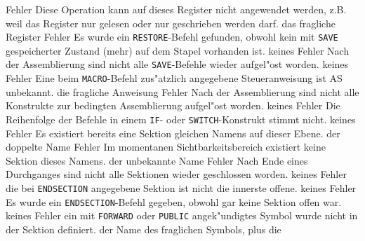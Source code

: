 \documentclass[12pt,a4paper,twoside]{report}
\newcommand{\tty}[1]{{\tt #1}}
\begin{document}
\begin{description}
               {Fehler}
               {Diese Operation kann auf dieses Register nicht angewendet werden, z.B.
                weil das Register nur gelesen oder nur geschrieben werden darf.}
               {das fragliche Register}
               {Fehler}
               {Es wurde ein \tty{RESTORE}-Befehl gefunden, obwohl
                kein mit \tty{SAVE} gespeicherter Zustand (mehr) auf dem Stapel
                vorhanden ist.}
               {keines}
               {Fehler}
               {Nach der Assemblierung sind nicht alle
                \tty{SAVE}-Befehle wieder aufgel"ost worden.}
               {keines}
               {Fehler}
               {Eine beim \tty{MACRO}-Befehl zus"atzlich angegebene
                Steueranweisung ist AS unbekannt.}
               {die fragliche Anweisung}
               {Fehler}
               {Nach der Assemblierung sind nicht alle
                Konstrukte zur bedingten Assemblierung aufgel"ost
                worden.}
               {keines}
               {Fehler}
               {Die Reihenfolge der Befehle in einem \tty{IF}-
	        oder \tty{SWITCH}-Konstrukt stimmt nicht.}
               {keines}
               {Fehler}
               {Es existiert bereits eine Sektion gleichen
                Namens auf dieser Ebene.}
               {der doppelte Name}
               {Fehler}
               {Im momentanen Sichtbarkeitsbereich existiert
                keine Sektion dieses Namens.}
               {der unbekannte Name}
               {Fehler}
               {Nach Ende eines Durchganges sind nicht alle
                Sektionen wieder geschlossen worden.}
               {keines}
               {Fehler}
               {die bei \tty{ENDSECTION} angegebene Sektion
	        ist nicht die innerste offene.}
               {keines}
               {Fehler}
               {Es wurde ein \tty{ENDSECTION}-Befehl gegeben, obwohl
                gar keine Sektion offen war.}
               {keines}
               {Fehler}
               {ein mit \tty{FORWARD} oder \tty{PUBLIC}
	        angek"undigtes Symbol wurde nicht in der Sektion definiert.}
               {der Name des fraglichen Symbols, plus die
}
\end{description}
\end{document}
